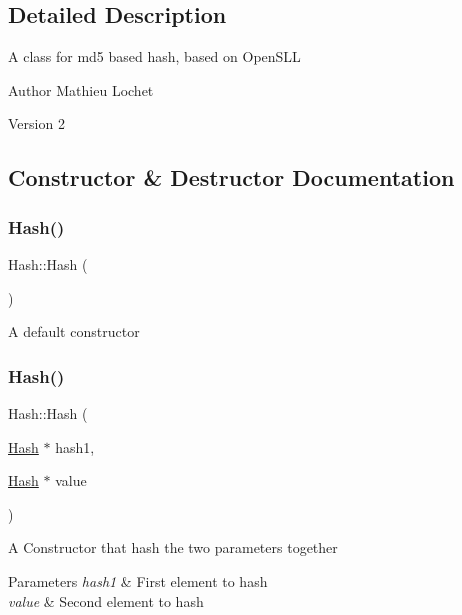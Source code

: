 \subsection{Detailed Description}
A class for md5 based hash, based on Open\+S\+LL

\begin{DoxyAuthor}{Author}
Mathieu Lochet 
\end{DoxyAuthor}
\begin{DoxyVersion}{Version}
2 
\end{DoxyVersion}


\subsection{Constructor \& Destructor Documentation}
\mbox{\label{classHash_af482880ad75b67a09d2dcb5e86244d80}} 
\subsubsection{\texorpdfstring{Hash()}{Hash()}\hspace{0.1cm}{\footnotesize\ttfamily [1/8]}}
{\footnotesize\ttfamily Hash\+::\+Hash (\begin{DoxyParamCaption}{ }\end{DoxyParamCaption})\hspace{0.3cm}{\ttfamily [default]}}

A default constructor \mbox{\label{classHash_a0e10d81c96b90a36443999a820e29136}} 
\subsubsection{\texorpdfstring{Hash()}{Hash()}\hspace{0.1cm}{\footnotesize\ttfamily [2/8]}}
{\footnotesize\ttfamily Hash\+::\+Hash (\begin{DoxyParamCaption}\item[{\mbox{\hyperlink{classHash}{Hash}} $\ast$}]{hash1,  }\item[{\mbox{\hyperlink{classHash}{Hash}} $\ast$}]{value }\end{DoxyParamCaption})}

A Constructor that hash the two parameters together


\begin{DoxyParams}{Parameters}
{\em hash1} & First element to hash \\
\hline
{\em value} & Second element to hash \\
\hline
\end{DoxyParams}
\mbox{\label{classHash_ae324d51c4ee733ef8f7656e6f1afbbd0}} 
